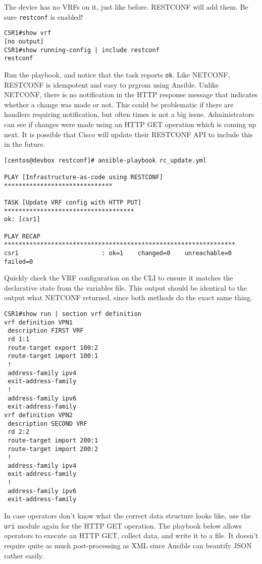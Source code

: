 The device has no VRFs on it, just like before. RESTCONF will add them.
Be sure \verb|restconf| is enabled!

\begin{verbatim}
CSR1#show vrf
[no output]
CSR1#show running-config | include restconf
restconf
\end{verbatim}

Run the playbook, and notice that the task reports \verb|ok|. Like NETCONF,
RESTCONF is idempotent and easy to prgrom using Ansible. Unlike NETCONF,
there is no notification in the HTTP response message that indicates whether
a change was made or not. This could be problematic if there are handlers
requiring notification, but often times is not a big issue. Administrators can
see if changes were made using an HTTP GET operation which is coming up next.
It is possible that Cisco will update their RESTCONF API to include this
in the future.

\begin{verbatim}
[centos@devbox restconf]# ansible-playbook rc_update.yml

PLAY [Infrastructure-as-code using RESTCONF] ******************************

TASK [Update VRF config with HTTP PUT] ************************************
ok: [csr1]

PLAY RECAP ****************************************************************
csr1                       : ok=1    changed=0    unreachable=0    failed=0
\end{verbatim}

Quickly check the VRF configuration on the CLI to ensure it matches
the declarative state from the variables file. This output should be
identical to the output what NETCONF returned, since both methods
do the exact same thing.

\begin{verbatim}
CSR1#show run | section vrf definition
vrf definition VPN1
 description FIRST VRF
 rd 1:1
 route-target export 100:2
 route-target import 100:1
 !
 address-family ipv4
 exit-address-family
 !
 address-family ipv6
 exit-address-family
vrf definition VPN2
 description SECOND VRF
 rd 2:2
 route-target import 200:1
 route-target import 200:2
 !
 address-family ipv4
 exit-address-family
 !
 address-family ipv6
 exit-address-family
\end{verbatim}

In case operators don't know what the correct data structure looks like,
use the \verb|uri| module again for the HTTP GET operation. The playbook
below allows operators to execute an HTTP GET, collect data, and write it
to a file. It doesn't require quite as much post-processing as XML since
Ansible can beautify JSON rather easily.

